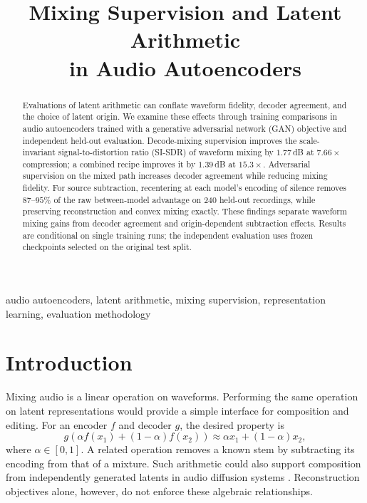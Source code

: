 \documentclass[conference]{IEEEtran}
\begin{document}
\title{Mixing Supervision and Latent Arithmetic\\in Audio Autoencoders}

\author{
}

\maketitle

\begin{abstract}
Evaluations of latent arithmetic can conflate waveform fidelity, decoder
agreement, and the choice of latent origin. We examine these effects through
training comparisons in audio autoencoders trained with a generative
adversarial network (GAN) objective and independent held-out evaluation.
Decode-mixing supervision improves the scale-invariant signal-to-distortion
ratio (SI-SDR) of waveform mixing by
$1.77$\,dB at $7.66\times$ compression; a combined recipe improves it by
$1.39$\,dB at $15.3\times$. Adversarial supervision on the mixed path
increases decoder agreement while reducing mixing fidelity. For source
subtraction, recentering at each model's encoding of silence removes
$87$--$95$\% of the raw between-model advantage on 240 held-out recordings,
while preserving reconstruction and convex mixing exactly. These findings
separate waveform mixing gains from decoder agreement and origin-dependent
subtraction effects. Results are conditional on single training runs; the
independent evaluation uses frozen checkpoints selected on the original test
split.
\end{abstract}

\begin{IEEEkeywords}
audio autoencoders, latent arithmetic, mixing supervision,
representation learning, evaluation methodology
\end{IEEEkeywords}

\section{Introduction}\label{sec:intro}
Mixing audio is a linear operation on waveforms. Performing the same
operation on latent representations would provide a simple interface for
composition and editing. For an encoder $f$ and decoder $g$, the desired
property is
\begin{equation}
  g\!\left(\alpha f(x_1)+(1{-}\alpha)f(x_2)\right)
  \approx \alpha x_1+(1{-}\alpha)x_2,
  \label{eq:equiv}
\end{equation}
where $\alpha\in[0,1]$. A related operation removes a known stem by
subtracting its encoding from that of a mixture. Such arithmetic could also
support composition from independently generated latents in audio diffusion
systems \cite{liu2023audioldm,evans2024stable}. Reconstruction objectives
alone, however, do not enforce these algebraic relationships.
\end{document}
